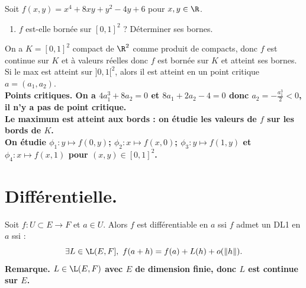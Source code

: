 \documentclass[11pt]{article}
\begin{document}
\vspace*{-0.3cm}

\begin{exercice}{}{}
    Soit $f(x,y)=x^4+8xy+y^2-4y+6$ pour $x,y\in\R$.
    \begin{enumerate}
        \item $f$ est-elle bornée sur $[0,1]^2$ ? Déterminer ses bornes.
    \end{enumerate}
    \tcblower
     On a $K=[0,1]^2$ compact de $\R^2$ comme produit de compacts, donc $f$ est continue sur $K$ et à valeurs réelles donc $f$ est bornée sur $K$ et atteint ses bornes. Si le max est atteint sur $]0,1[^2$, alors il est atteint en un point critique $a=(a_1,a_2)$.\\
    \bf{Points critiques.} On a $4a_1^3 + 8a_2 = 0$ et $8a_1 + 2a_2 - 4 = 0$ donc $a_2=-\frac{a_1^3}{2}<0$, il n'y a pas de point critique.\\
    Le maximum est atteint aux bords : on étudie les valeurs de $f$ sur les bords de $K$.\\
    On étudie $\phi_1:y\mapsto f(0,y)$; $\phi_2:x\mapsto f(x,0)$; $\phi_3:y\mapsto f(1,y)$ et $\phi_4:x\mapsto f(x,1)$ pour $(x,y)\in[0,1]^2$.
\end{exercice}

\vspace*{-0.3cm}

\section{Différentielle.}

\begin{defi}{}{}
    Soit $f:U\subset E\to F$ et $a\in U$. Alors $f$ est différentiable en $a$ ssi $f$ admet un DL1 en $a$ ssi :
    \begin{equation*}
        \exists L \in \L(E,F], ~ f(a+h) =f(a) + L(h) + o(\|h\|).
    \end{equation*}
    \bf{Remarque.} $L\in\L(E,F)$ avec $E$ de dimension finie, donc $L$ est continue sur $E$.
\end{defi}

\vspace*{-0.3cm}
\end{document}
